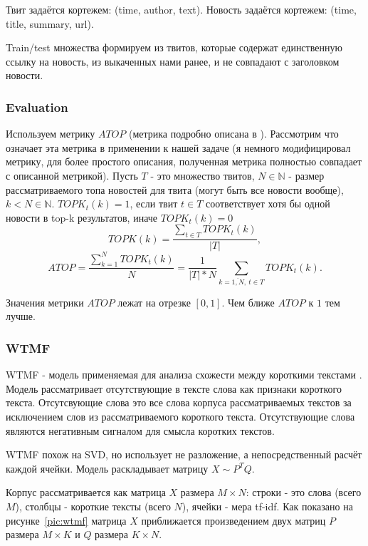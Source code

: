             Твит задаётся кортежем: (time, author, text). Новость задаётся кортежем: (time, title, summary, url).

            Train/test множества формируем из твитов, которые содержат единственную ссылку на новость, из выкаченных нами ранее, и не совпадают с заголовком новости.

        \subsubsection{Evaluation}
            Используем метрику $ATOP$ (метрика подробно описана в \cite{steck_recommender}).
            Рассмотрим что означает эта метрика в применении к нашей задаче (я немного модифицировал метрику, для более простого описания, полученная метрика полностью совпадает с описанной метрикой).
            Пусть $T$ - это множество твитов, $N \in \mathbb{N}$ - размер рассматриваемого топа новостей для твита (могут быть все новости вообще), $k < N \in \mathbb{N}$.
            $TOPK_t(k) = 1$, если твит $t \in T$ соответствует хотя бы одной новости в top-k результатов, иначе $TOPK_t(k) = 0$
            $$TOPK(k) = \dfrac {\sum_{t \in T} TOPK_t(k)} {|T|},$$
            $$ATOP = \dfrac{\sum_{k=1}^N TOPK_t(k)}{N} = \dfrac{1}{|T| * N} \sum_{k=\overline{1,N}, ~t \in T} TOPK_t(k).$$

            Значения метрики $ATOP$ лежат на отрезке $[0,1]$. Чем ближе $ATOP$ к $1$ тем лучше.

        \subsubsection{WTMF}
            WTMF - модель применяемая для анализа схожести между короткими текстами \cite{wtmf}. Модель рассматривает отсутствующие в тексте слова как признаки короткого текста. Отсутсвующие слова это все слова корпуса рассматриваемых текстов за исключением слов из рассматриваемого короткого текста. Отсутствующие слова являются негативным сигналом для смысла коротких текстов.

            WTMF похож на SVD, но использует не разложение, а непосредственный расчёт каждой ячейки. Модель раскладывает матрицу $X \sim P^TQ$.

            Корпус рассматривается как матрица $X$ размера $M \times N$: строки - это слова (всего $M$), столбцы - короткие тексты (всего $N$), ячейки - мера tf-idf. 
            Как показано на рисунке~\ref{pic:wtmf} матрица $X$ приближается произведением двух матриц $P$ размера $M \times K$ и $Q$ размера $K \times N$.

